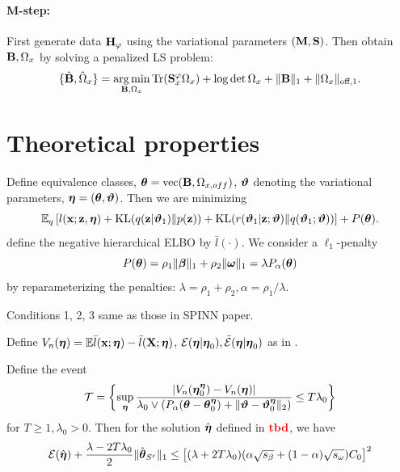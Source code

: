 \documentclass[11pt,letterpaper]{article}
\DeclareMathOperator*{\ve}{vec}
\DeclareMathOperator*{\Tr}{Tr}
\DeclareMathOperator*{\argmin}{arg\,min}
\DeclareMathOperator*{\kl}{\text{KL}}
\DeclareMathOperator*{\rtbd}{{\colrbf tbd}}
\numberwithin{equation}{section}
\begin{document}
\paragraph{M-step:} First generate data ${\mathbf{H}}_\varphi$ using the variational parameters $({\mathbf{M}}, {\mathbf{S}})$. Then obtain ${\mathbf{B}},\Omega_x$ by solving a penalized LS  problem:
%
$$
\{ \hat \bfB, \hat \Omega_x \} = \argmin_{\bfB,\Omega_x} \Tr(\bfS^\varphi_x \Omega_x) + \log \det \Omega_x + \| \bfB \|_1 + \| \Omega_x \|_{\text{off},1}.
$$
%

\section{Theoretical properties}
Define equivalence classes, $\bftheta = \ve (\bfB, \Omega_{x,off})$, ${\boldsymbol{\vartheta}}$ denoting the variational parameters, ${\boldsymbol{\eta}} = ({\boldsymbol{\theta}}, {\boldsymbol{\vartheta}})$. Then we are minimizing
%
$$
\BE_q \left[ l(\bfx; \bfz, \bfeta) + \kl(q(\bfz| \bfvt_1) \| p(\bfz)) +
\kl( r(\bfvt_1| \bfz; \bfvt) \| q(\bfvt_1; \bfvt)) \right] + P( \bftheta ).
$$
%
define the negative hierarchical ELBO by $\bar l(\cdot)$. We consider a $\ell_1$-penalty
%
$$ P({\boldsymbol{\theta}}) = \rho_1 \| {\boldsymbol{\beta}} \|_1 + \rho_2 \| {\boldsymbol{\omega}} \|_1 = \lambda P_\alpha ({\boldsymbol{\theta}}) $$
%
by reparameterizing the penalties: $ \lambda = \rho_1 + \rho_2, \alpha = \rho_1/\lambda$.

Conditions 1, 2, 3 same as those in SPINN paper.

Define $V_n({\boldsymbol{\eta}}) = {\mathbb{E}} \bar l({\bf{x}}; {\boldsymbol{\eta}}) - \bar l({\mathbf{X}}; {\boldsymbol{\eta}})$, ${\cal{E}}({\boldsymbol{\eta}}|{\boldsymbol{\eta}}_0), \bar {{\cal{E}}}({\boldsymbol{\eta}}|{\boldsymbol{\eta}}_0)$ as in \cite{StadlerEtal10}.

\begin{Theorem}\label{thm:thm1}
Define the event
%
$$
{\cal{T}} = \left\{ \sup_{\boldsymbol{\eta}} \frac{ |V_n({\boldsymbol{\eta}}_0^{\boldsymbol{\eta}}) - V_n({\boldsymbol{\eta}})| }{\lambda_0 \vee
(P_\alpha({\boldsymbol{\theta}} - {\boldsymbol{\theta}}_0^{\boldsymbol{\eta}}) + \| {\boldsymbol{\vartheta}} - {\boldsymbol{\vartheta}}_0^{\boldsymbol{\eta}} \|_2) }
\leq T \lambda_0 \right\}
$$
%
for $T \geq 1, \lambda_0 > 0$. Then for the solution $\hat {{\boldsymbol{\eta}}}$ defined in $\rtbd$, we have
%
$$
{\cal{E}}(\hat {{\boldsymbol{\eta}}} ) + \frac{\lambda - 2T\lambda_0}{2} \| \hat {{\boldsymbol{\theta}}}_{S^c} \|_1 \leq
\left[ (\lambda + 2T\lambda_0) (\alpha \sqrt{s_\beta} + (1-\alpha) \sqrt{s_\omega}) C_0 \right]^2
$$

\end{Theorem}
\end{document}
